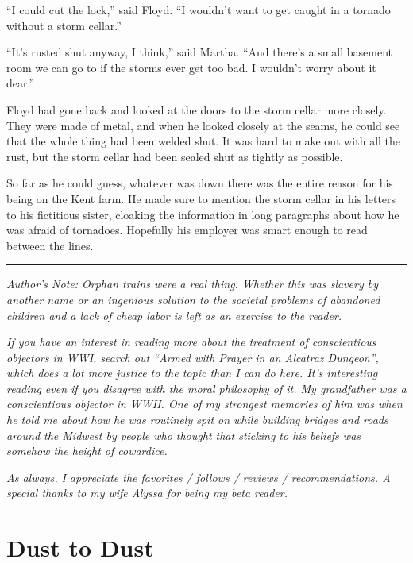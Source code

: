\documentclass[ebook,12pt]{memoir}
\begin{document}
``I could cut the lock,'' said Floyd. ``I wouldn't want to get caught in
a tornado without a storm cellar.''

``It's rusted shut anyway, I think,'' said Martha. ``And there's a small
basement room we can go to if the storms ever get too bad. I wouldn't
worry about it dear.''

Floyd had gone back and looked at the doors to the storm cellar more
closely. They were made of metal, and when he looked closely at the
seams, he could see that the whole thing had been welded shut. It was
hard to make out with all the rust, but the storm cellar had been sealed
shut as tightly as possible.

So far as he could guess, whatever was down there was the entire reason
for his being on the Kent farm. He made sure to mention the storm cellar
in his letters to his fictitious sister, cloaking the information in
long paragraphs about how he was afraid of tornadoes. Hopefully his
employer was smart enough to read between the lines.

\begin{center}\rule{0.5\linewidth}{0.5pt}\end{center}

\emph{Author's Note: Orphan trains were a real thing. Whether this was
slavery by another name or an ingenious solution to the societal
problems of abandoned children and a lack of cheap labor is left as an
exercise to the reader.}

\emph{If you have an interest in reading more about the treatment of
conscientious objectors in WWI, search out ``Armed with Prayer in an
Alcatraz Dungeon'', which does a lot more justice to the topic than I
can do here. It's interesting reading even if you disagree with the
moral philosophy of it. My grandfather was a conscientious objector in
WWII. One of my strongest memories of him was when he told me about how
he was routinely spit on while building bridges and roads around the
Midwest by people who thought that sticking to his beliefs was somehow
the height of cowardice.}

\emph{As always, I appreciate the favorites / follows / reviews /
recommendations. A special thanks to my wife Alyssa for being my beta
reader.}



\hypertarget{dust-to-dust}{%
\chapter{Dust to Dust}\label{dust-to-dust}}
\end{document}
